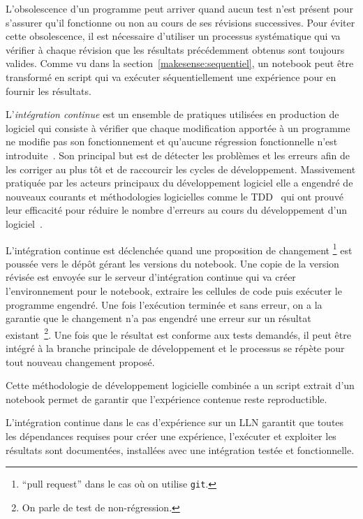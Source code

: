 L'obsolescence d'un programme peut arriver quand aucun test n'est présent pour s'assurer qu'il fonctionne ou non au cours de ses révisions successives.
Pour éviter cette obsolescence, il est nécessaire d'utiliser un processus systématique qui va vérifier à chaque révision que les résultats précédemment obtenus sont toujours valides.
Comme vu dans la section~\ref{makesense:sequentiel}, un notebook peut être transformé en script qui va exécuter séquentiellement une expérience pour en fournir les résultats.

L'\emph{intégration continue} est un ensemble de pratiques utilisées en production de logiciel qui consiste à vérifier que chaque modification apportée à un programme ne modifie pas son fonctionnement et qu'aucune régression fonctionnelle n'est introduite~\cite{duvall2007continuous}.
Son principal but est de détecter les problèmes et les erreurs afin de les corriger au plus tôt et de raccourcir les cycles de développement.
Massivement pratiquée par les acteurs principaux du développement logiciel elle a engendré de nouveaux courants et méthodologies logicielles comme le \ac{TDD}~\cite{beck2003test} qui ont prouvé leur efficacité pour réduire le nombre d'erreurs au cours du développement d'un logiciel~\cite{maximilien2003assessing}. 

L'intégration continue est déclenchée quand une proposition de changement \footnote{``pull request'' dans le cas où on utilise \texttt{git}.} est poussée vers le dépôt gérant les versions du notebook.
Une copie de la version révisée est envoyée sur le serveur d'intégration continue qui va créer l'environnement pour le notebook, extraire les cellules de code puis exécuter le programme engendré.
Une fois l'exécution terminée et sans erreur, on a la garantie que le changement n'a pas engendré une erreur sur un résultat existant~\footnote{On parle de test de non-régression.}.
Une fois que le résultat est conforme aux tests demandés, il peut être intégré à la branche principale de développement et le processus se répète pour tout nouveau changement proposé.

Cette méthodologie de développement logicielle combinée a un script extrait d'un notebook permet de garantir que l'expérience contenue reste reproductible.

L'intégration continue dans le cas d'expérience sur un \ac{LLN} garantit que toutes les dépendances requises pour créer une expérience, l'exécuter et exploiter les résultats sont documentées, installées avec une intégration testée et fonctionnelle.

